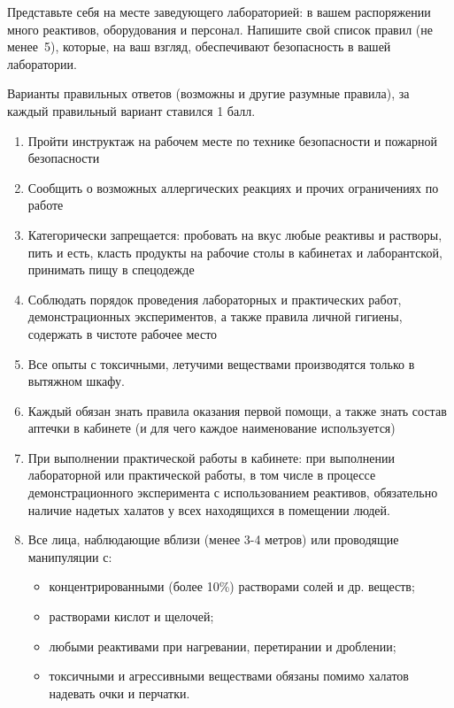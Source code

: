 
Представьте себя на месте заведующего лабораторией: в вашем распоряжении много реактивов, оборудования и персонал. Напишите свой список правил (не менее~5), которые, на ваш взгляд, обеспечивают безопасность в вашей лаборатории.

Варианты правильных ответов (возможны и другие разумные правила), за каждый правильный вариант ставился 1 балл.

\answerMath

\begin{enumerate}
    \item Пройти инструктаж на рабочем месте по технике безопасности и пожарной безопасности
    \item Сообщить о возможных аллергических реакциях и прочих ограничениях по работе
    \item Категорически запрещается: пробовать на вкус любые реактивы и растворы, пить и есть, класть продукты на рабочие столы в кабинетах и лаборантской, принимать пищу в спецодежде
    \item Соблюдать порядок проведения лабораторных и практических работ, демонстрационных экспериментов, а также правила личной гигиены, содержать в чистоте рабочее место
    \item Все опыты с токсичными, летучими веществами производятся только в вытяжном шкафу.
    \item Каждый обязан знать правила оказания первой помощи, а также знать состав аптечки в кабинете (и для чего каждое наименование используется)
    \item При выполнении практической работы в кабинете: при выполнении лабораторной или практической работы, в том числе в процессе демонстрационного эксперимента с использованием реактивов, обязательно наличие надетых халатов у всех находящихся в помещении людей.
    \item Все лица, наблюдающие вблизи (менее 3-4 метров) или проводящие манипуляции с:
    \begin{itemize}
        \item концентрированными (более 10\%) растворами солей и др. веществ;
        \item растворами кислот и щелочей;
        \item любыми реактивами при нагревании, перетирании и дроблении;
        \item токсичными и агрессивными веществами обязаны помимо халатов надевать очки и перчатки.
    \end{itemize}

\end{enumerate}
